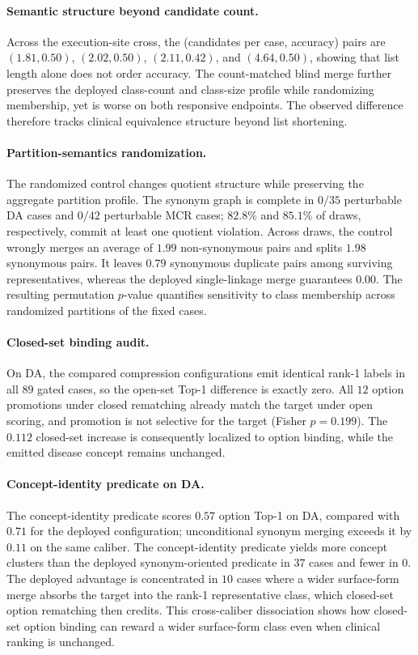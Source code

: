 \documentclass[letterpaper]{article}
\begin{document}
\paragraph{Semantic structure beyond candidate count.}
Across the execution-site cross, the (candidates per case, accuracy) pairs are $(1.81,0.50)$, $(2.02,0.50)$, $(2.11,0.42)$, and $(4.64,0.50)$, showing that list length alone does not order accuracy.
The count-matched blind merge further preserves the deployed class-count and class-size profile while randomizing membership, yet is worse on both responsive endpoints.
The observed difference therefore tracks clinical equivalence structure beyond list shortening.

\paragraph{Partition-semantics randomization.}
The randomized control changes quotient structure while preserving the aggregate partition profile.
The synonym graph is complete in $0/35$ perturbable DA cases and $0/42$ perturbable MCR cases; $82.8\%$ and $85.1\%$ of draws, respectively, commit at least one quotient violation.
Across draws, the control wrongly merges an average of $1.99$ non-synonymous pairs and splits $1.98$ synonymous pairs.
It leaves $0.79$ synonymous duplicate pairs among surviving representatives, whereas the deployed single-linkage merge guarantees $0.00$.
The resulting permutation $p$-value quantifies sensitivity to class membership across randomized partitions of the fixed cases.

\paragraph{Closed-set binding audit.}
On DA, the compared compression configurations emit identical rank-1 labels in all $89$ gated cases, so the open-set Top-1 difference is exactly zero.
All $12$ option promotions under closed rematching already match the target under open scoring, and promotion is not selective for the target (Fisher $p=0.199$).
The $0.112$ closed-set increase is consequently localized to option binding, while the emitted disease concept remains unchanged.

\paragraph{Concept-identity predicate on DA.}
The concept-identity predicate scores $0.57$ option Top-1 on DA, compared with $0.71$ for the deployed configuration; unconditional synonym merging exceeds it by $0.11$ on the same caliber.
The concept-identity predicate yields more concept clusters than the deployed synonym-oriented predicate in $37$ cases and fewer in $0$.
The deployed advantage is concentrated in $10$ cases where a wider surface-form merge absorbs the target into the rank-1 representative class, which closed-set option rematching then credits.
This cross-caliber dissociation shows how closed-set option binding can reward a wider surface-form class even when clinical ranking is unchanged.
\end{document}
